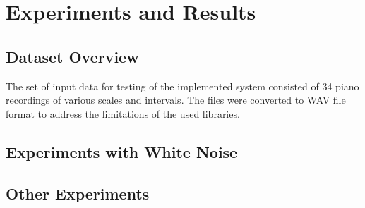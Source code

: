 \chapter{Experiments and Results}\label{chapter:experiments}


\section{Dataset Overview}\label{section:experiments_dataset}

The set of input data for testing of the implemented system consisted of 34 piano recordings of various scales and intervals. The files were converted to WAV file format to address the limitations of the used libraries.

\section{Experiments with White Noise}
\section{Other Experiments}
